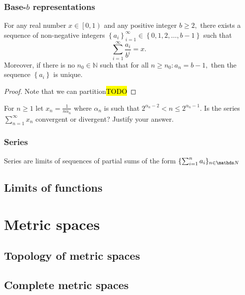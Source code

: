 \subsubsection{\label{subsec:baseBRepresentations}Base-$b$ representations}
\begin{thm}
\label{thm:realDecimalExpansion}For any real number $x\in\left[0,1\right)$
and any positive integer $b\geq2,$ there exists a sequence of non-negative
integers $\left\{ a_{i}\right\} _{i=1}^{\infty}\in\left\{ 0,1,2,\ldots,b-1\right\} $
such that 
\[
\sum_{i=1}^{\infty}\frac{a_{i}}{b^{i}}=x.
\]
Moreover, if there is no $n_{0}\in\mathbb{N}$ such that for all $n\geq n_{0}:a_{n}=b-1,$
then the sequence $\left\{ a_{i}\right\} $ is unique.
\end{thm}

\begin{proof}
Note that we can partition\hl{TODO}
\end{proof}
\begin{example}
\label{exa:isi2004samplepsb11}For $n\geq1$ let $x_{n}=\frac{1}{n\alpha_{n}}$
where $\alpha_{n}$ is such that $2^{\alpha_{n}-2}<n\leq2^{\alpha_{n}-1}$.
Is the series $\sum_{n=1}^{\infty}x_{n}$ convergent or divergent?
Justify your answer.
\end{example}

\subsubsection{Series}

Series are limits of sequences of partial sums of the form $\{\sum_{i=1}^n a_i \}_{n\in\N}$


\subsection{Limits of functions}


\section{Metric spaces}

\subsection{Topology of metric spaces}

\subsection{Complete metric spaces}

